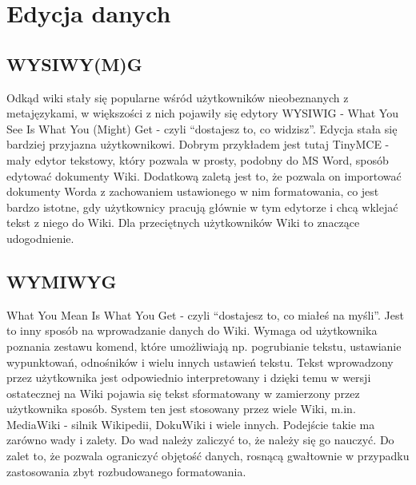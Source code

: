 \documentclass{article}
\begin{document}
\section{Edycja danych}
	\subsection{WYSIWY(M)G}
	Odkąd wiki stały się popularne wśród użytkowników nieobeznanych z metajęzykami, 
w większości z nich pojawiły się edytory WYSIWIG - What You See Is What You (Might) Get - czyli ``dostajesz to, co widzisz''. Edycja stała się bardziej przyjazna użytkownikowi. Dobrym przykładem jest tutaj TinyMCE - mały edytor tekstowy, który pozwala w prosty, podobny do MS Word, sposób edytować dokumenty Wiki. Dodatkową zaletą jest to, że pozwala on importować dokumenty Worda z zachowaniem ustawionego w nim formatowania, co jest bardzo istotne, gdy użytkownicy pracują głównie w tym edytorze i chcą wklejać tekst z niego do Wiki. Dla przeciętnych użytkowników Wiki to znaczące udogodnienie.

	\subsection{WYMIWYG}
	
What You Mean Is What You Get - czyli ``dostajesz to, co miałeś na myśli''. Jest to inny sposób na wprowadzanie danych do Wiki. Wymaga od użytkownika poznania zestawu komend, które umożliwiają np. pogrubianie tekstu, ustawianie wypunktowań, odnośników i wielu innych ustawień tekstu. Tekst wprowadzony przez użytkownika jest odpowiednio interpretowany i dzięki temu w wersji ostatecznej na Wiki pojawia się tekst sformatowany w zamierzony przez użytkownika sposób. System ten jest stosowany przez wiele Wiki, m.in. MediaWiki - silnik Wikipedii, DokuWiki i wiele innych. Podejście takie ma zarówno wady i zalety. Do wad należy zaliczyć to, że należy się go nauczyć. Do zalet to, że pozwala ograniczyć objętość danych, rosnącą gwałtownie w przypadku zastosowania zbyt rozbudowanego formatowania.
\end{document}
